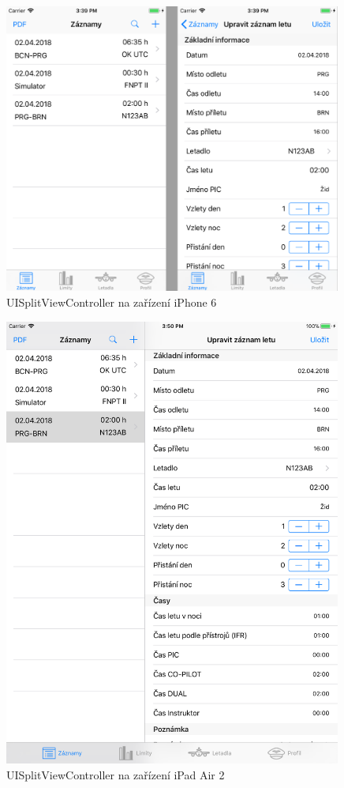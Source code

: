 \documentclass[thesis=M,czech]{FITthesis}[2012/06/26]
\begin{document}
\begin{figure}[]\centering
 \includegraphics[width=0.99\textwidth]{./pictures/UISplitView/iphone}
 \caption[UISplitViewController na zařízení iPhone 6]{UISplitViewController na zařízení iPhone 6}\label{fig:split1}
\end{figure}

\begin{figure}[]\centering
 \includegraphics[width=0.99\textwidth]{./pictures/UISplitView/ipad}
 \caption[UISplitViewController na zařízení iPad Air 2]{UISplitViewController na zařízení iPad Air 2}\label{fig:split2}
\end{figure}
\end{document}
